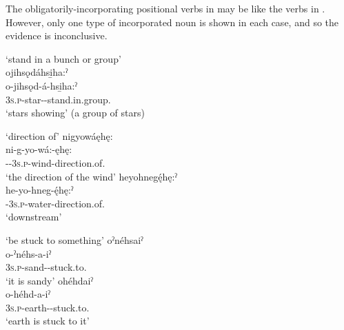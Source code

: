 The obligatorily-incorporating positional verbs in  may be like the verbs in . However, only one type of incorporated noun is shown in each case, and so the evidence is inconclusive.
 
\ea\label{ex:positppchoiceex6}  ‘stand in a bunch or group’\\
ojihsǫdáhsi̱ha:ˀ\\
\gll o-jihsǫd-á-hsi̱ha:ˀ\\
\textsc{3s.p}-star-{\joinerA}-stand.in.group.{\stative}\\
\glt ‘stars showing’ (a group of stars)

\z


\ea\label{ex:positppchoiceex600}  ‘direction of’
\ea nigyowáęhę:\\
\gll ni-g-yo-wá:-ęhę:\\
 {\partitive}-{\cislocative}-\textsc{3s.p}-wind-direction.of.{\stative}\\
\glt `the direction of the wind'
\ex heyohnegę́hę:ˀ\\
\gll he-yo-hneg-ę́hę:ˀ\\
 {\translocative}-\textsc{3s.p}-water-direction.of.{\stative}\\
\glt `downstream'
\z
\z

\ea\label{ex:positppchoiceex601}  ‘be stuck to something’
\ea oˀnéhsaiˀ\\
\gll o-ˀnéhs-a-iˀ\\
 \textsc{3s.p}-sand-{\joinerA}-stuck.to.{\stative}\\
\glt `it is sandy'
\ex ohéhdaiˀ\\
\gll o-héhd-a-iˀ\\
 \textsc{3s.p}-earth-{\joinerA}-stuck.to.{\stative}\\
\glt `earth is stuck to it'
\z
\z


